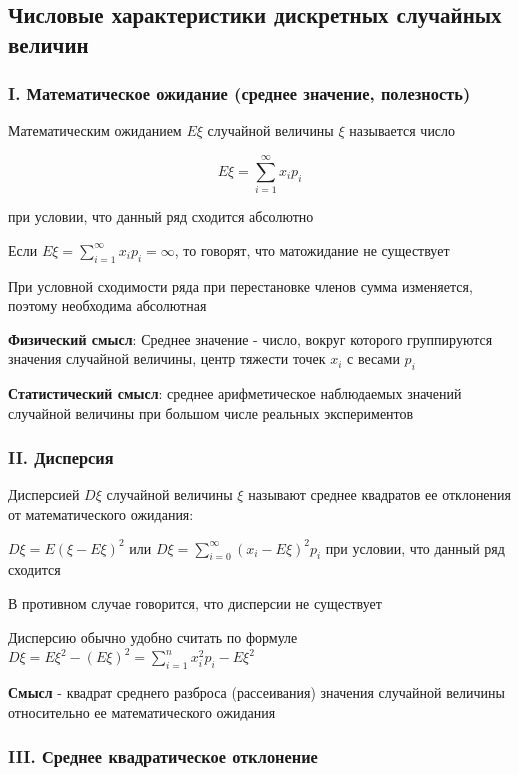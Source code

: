 \documentclass[12pt]{article}
\begin{document}
    \subsection{Числовые характеристики дискретных случайных величин}

    \subsubsection{I. Математическое ожидание (среднее значение, полезность)}

    \Defs Математическим ожиданием $E\xi$ случайной величины $\xi$ называется число

    \[ E\xi = \sum_{i = 1}^\infty x_i p_i \]

    при условии, что данный ряд сходится абсолютно

    \Nota Если $E\xi = \sum_{i = 1}^\infty x_i p_i = \infty$, то говорят, что матожидание не существует

    При условной сходимости ряда при перестановке членов сумма изменяется, поэтому необходима абсолютная

    \textbf{Физический смысл}: Среднее значение - число, вокруг которого группируются значения случайной величины, центр тяжести точек $x_i$ с весами $p_i$

    \textbf{Статистический смысл}: среднее арифметическое наблюдаемых значений случайной величины при
    большом числе реальных экспериментов

    \subsubsection{II. Дисперсия}

    \Defs Дисперсией $D\xi$ случайной величины $\xi$ называют среднее квадратов ее отклонения от математического ожидания:

    $D\xi = E (\xi - E\xi)^2$ или $D\xi = \sum_{i = 0}^\infty (x_i - E\xi)^2 p_i$ при условии, что данный ряд сходится

    В противном случае говорится, что дисперсии не существует

    \Nota Дисперсию обычно удобно считать по формуле $D\xi = E\xi^2 - (E\xi)^2 = \sum_{i = 1}^n x^2_i p_i - E\xi^2$

    \textbf{Смысл} - квадрат среднего разброса (рассеивания) значения случайной величины относительно ее математического
    ожидания

    \subsubsection{III. Среднее квадратическое отклонение}
\end{document}
